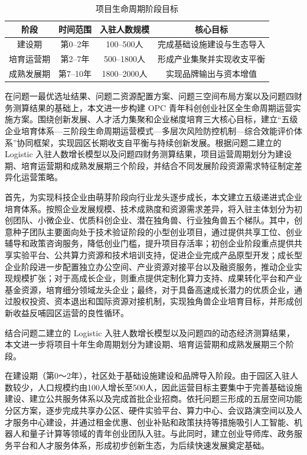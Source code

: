 \documentclass[12pt,a4paper]{article}
\begin{document}
\begin{table}[H]
\centering
\caption{项目生命周期阶段目标}
\begin{tabular}{cccc}
\hline
阶段 & 时间范围 & 入驻人数规模 & 核心目标 \\
\hline
建设期 & 第0--2年 & 100--500人 & 完成基础设施建设与生态导入 \\
培育运营期 & 第2--7年 & 500--1800人 & 形成产业集聚并实现收支平衡 \\
成熟发展期 & 第7--10年 & 1800--2000人 & 实现品牌输出与资本增值 \\
\hline
\end{tabular}
\label{tab:lifecycle}
\end{table}
在问题一最优选址结果、问题二资源配置方案、问题三空间布局方案以及问题四财务测算结果的基础上，本文进一步构建 OPC 青年科创创业社区全生命周期运营实施方案。围绕创新发展、人才活力集聚和企业梯度培育三大核心目标，建立“五级企业培育体系—三阶段生命周期运营模式—多层次风险防控机制—综合效能评价体系”协同框架，实现园区长期收支自平衡与持续创新发展。根据问题二建立的 Logistic 入驻人数增长模型以及问题四财务测算结果，项目运营周期划分为建设期、培育运营期和成熟发展期三个阶段，并结合不同发展阶段资源需求特征制定差异化运营策略。

首先，为实现科技企业由萌芽阶段向行业龙头逐步成长，本文建立五级递进式企业培育体系。按照企业发展规模、技术成熟度和资源需求差异，将入驻主体划分为初创团队、小微企业、优质科创企业、潜在独角兽、行业独角兽五个梯队。其中，创意种子团队主要面向处于技术验证阶段的小型创业项目，通过提供共享工位、创业辅导和政策咨询服务，降低创业门槛，提升项目存活率；初创企业阶段重点提供共享实验平台、公共算力资源和技术培训支持，促进企业完成产品原型开发；成长型企业阶段进一步配置独立办公空间、产业资源对接平台以及融资服务，推动企业实现规模扩张；对于高成长企业，则重点提供定制化算力支持、成果转化平台和产业基金资源，培育细分领域龙头企业；最终，对于具备高速成长潜力的优质企业，通过股权投资、资本退出和国际资源对接机制，实现独角兽企业培育目标，并形成创新收益反哺园区运营的良性循环。

结合问题二建立的 Logistic 入驻人数增长模型以及问题四的动态经济测算结果，本文进一步将项目十年生命周期划分为建设期、培育运营期和成熟发展期三个阶段。

在建设期（第0～2年），社区处于基础设施建设和品牌导入阶段。由于园区入驻人数较少，人口规模约由100人增长至500人，因此运营目标主要集中于完善基础设施建设、建立公共服务体系以及完成首批企业招商。依托问题三形成的五层空间功能分区方案，逐步完成共享办公区、硬件实验平台、算力中心、会议路演空间以及人才服务中心建设，并通过租金优惠、创业补贴和政策扶持等措施吸引人工智能、机器人和量子计算等领域的青年创业团队入驻。与此同时，建立创业导师库、政务服务平台和人才服务体系，形成初步创新生态，为后续快速发展奠定基础。
\end{document}
